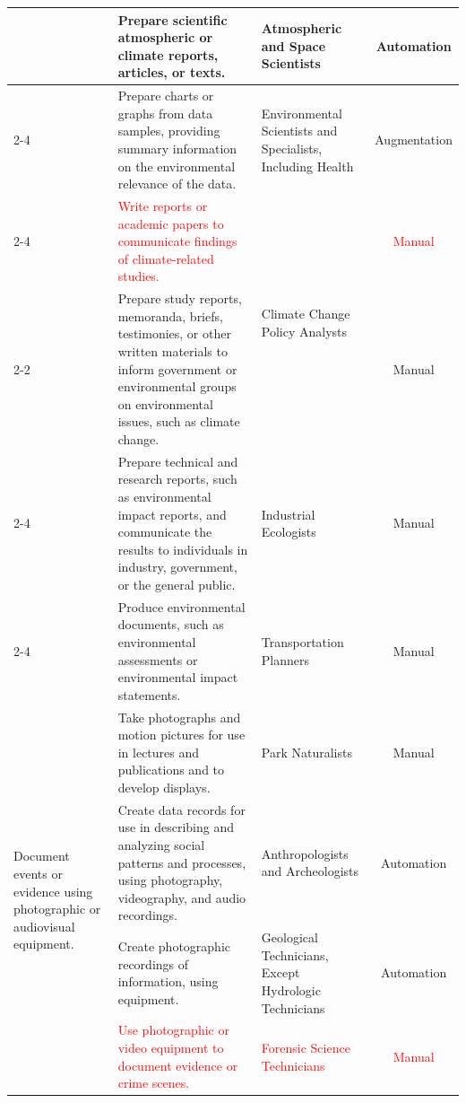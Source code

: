 \begin{tabular}{|l|p{15cm}|l|c|}
& Prepare scientific atmospheric or climate reports, articles, or texts. &
Atmospheric and Space Scientists & Automation \\ \cline{2-4}

& Prepare charts or graphs from data samples, providing summary information on the environmental relevance of the data. &
Environmental Scientists and Specialists, Including Health & Augmentation \\ \cline{2-4}

& \textcolor{red}{Write reports or academic papers to communicate findings of climate-related studies.} &
\multirow{2}{*}{Climate Change Policy Analysts} & \textcolor{red}{Manual} \\ \cline{2-2}\cline{4-4}

& Prepare study reports, memoranda, briefs, testimonies, or other written materials to inform government or environmental groups on environmental issues, such as climate change. &
 & Manual \\ \cline{2-4}

& Prepare technical and research reports, such as environmental impact reports, and communicate the results to individuals in industry, government, or the general public. &
Industrial Ecologists & Manual \\ \cline{2-4}

& Produce environmental documents, such as environmental assessments or environmental impact statements. &
Transportation Planners & Manual \\ \hline


\multirow{4}{*}{Document events or evidence using photographic or audiovisual equipment.} &
Take photographs and motion pictures for use in lectures and publications and to develop displays. &
Park Naturalists & Manual \\ \cline{2-4}

& Create data records for use in describing and analyzing social patterns and processes, using photography, videography, and audio recordings. &
Anthropologists and Archeologists & Automation \\ \cline{2-4}

& Create photographic recordings of information, using equipment. &
Geological Technicians, Except Hydrologic Technicians & Automation \\ \cline{2-4}

& \textcolor{red}{Use photographic or video equipment to document evidence or crime scenes.} &
\textcolor{red}{Forensic Science Technicians} & \textcolor{red}{Manual} \\ \hline

\end{tabular}